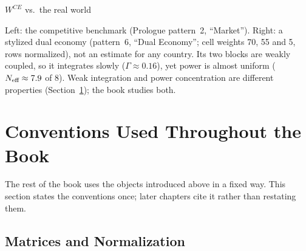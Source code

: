 \documentclass[../structural_economics_book.tex]{subfiles}
\begin{document}
\begin{vizpanel}{$W^{CE}$ vs.\ the real world}
\begin{center}
\end{center}
\vspace{-0.5em}
\small Left: the competitive benchmark (Prologue pattern~2, ``Market''). Right: a stylized dual economy (pattern~6, ``Dual Economy''; cell weights 70, 55 and 5, rows normalized), not an estimate for any country. Its two blocks are weakly coupled, so it integrates slowly ($\Gamma \approx 0.16$), yet power is almost uniform ($N_{\text{eff}} \approx 7.9$ of 8). Weak integration and power concentration are different properties (Section~\ref{ch01:sec:conventions}); the book studies both.
\end{vizpanel}


\section{Conventions Used Throughout the Book}
\label{ch01:sec:conventions}

The rest of the book uses the objects introduced above in a fixed way. This section states the conventions once; later chapters cite it rather than restating them.

\subsection{Matrices and Normalization}
\end{document}
